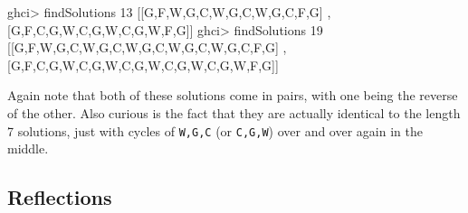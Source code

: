 \documentclass[]{article}
\newenvironment{Shaded}{}{}
\newcommand{\DataTypeTok}[1]{\textcolor[rgb]{0.56,0.13,0.00}{{#1}}}
\newcommand{\DecValTok}[1]{\textcolor[rgb]{0.25,0.63,0.44}{{#1}}}
\newcommand{\FunctionTok}[1]{\textcolor[rgb]{0.02,0.16,0.49}{{#1}}}
\newcommand{\NormalTok}[1]{{#1}}
\begin{document}
\begin{Shaded}
\begin{Highlighting}[]
\NormalTok{ghci}\FunctionTok{>} \NormalTok{findSolutions }\DecValTok{13}
\NormalTok{[[}\DataTypeTok{G}\NormalTok{,}\DataTypeTok{F}\NormalTok{,}\DataTypeTok{W}\NormalTok{,}\DataTypeTok{G}\NormalTok{,}\DataTypeTok{C}\NormalTok{,}\DataTypeTok{W}\NormalTok{,}\DataTypeTok{G}\NormalTok{,}\DataTypeTok{C}\NormalTok{,}\DataTypeTok{W}\NormalTok{,}\DataTypeTok{G}\NormalTok{,}\DataTypeTok{C}\NormalTok{,}\DataTypeTok{F}\NormalTok{,}\DataTypeTok{G}\NormalTok{]}
\NormalTok{,[}\DataTypeTok{G}\NormalTok{,}\DataTypeTok{F}\NormalTok{,}\DataTypeTok{C}\NormalTok{,}\DataTypeTok{G}\NormalTok{,}\DataTypeTok{W}\NormalTok{,}\DataTypeTok{C}\NormalTok{,}\DataTypeTok{G}\NormalTok{,}\DataTypeTok{W}\NormalTok{,}\DataTypeTok{C}\NormalTok{,}\DataTypeTok{G}\NormalTok{,}\DataTypeTok{W}\NormalTok{,}\DataTypeTok{F}\NormalTok{,}\DataTypeTok{G}\NormalTok{]]}
\NormalTok{ghci}\FunctionTok{>} \NormalTok{findSolutions }\DecValTok{19}
\NormalTok{[[}\DataTypeTok{G}\NormalTok{,}\DataTypeTok{F}\NormalTok{,}\DataTypeTok{W}\NormalTok{,}\DataTypeTok{G}\NormalTok{,}\DataTypeTok{C}\NormalTok{,}\DataTypeTok{W}\NormalTok{,}\DataTypeTok{G}\NormalTok{,}\DataTypeTok{C}\NormalTok{,}\DataTypeTok{W}\NormalTok{,}\DataTypeTok{G}\NormalTok{,}\DataTypeTok{C}\NormalTok{,}\DataTypeTok{W}\NormalTok{,}\DataTypeTok{G}\NormalTok{,}\DataTypeTok{C}\NormalTok{,}\DataTypeTok{W}\NormalTok{,}\DataTypeTok{G}\NormalTok{,}\DataTypeTok{C}\NormalTok{,}\DataTypeTok{F}\NormalTok{,}\DataTypeTok{G}\NormalTok{]}
\NormalTok{,[}\DataTypeTok{G}\NormalTok{,}\DataTypeTok{F}\NormalTok{,}\DataTypeTok{C}\NormalTok{,}\DataTypeTok{G}\NormalTok{,}\DataTypeTok{W}\NormalTok{,}\DataTypeTok{C}\NormalTok{,}\DataTypeTok{G}\NormalTok{,}\DataTypeTok{W}\NormalTok{,}\DataTypeTok{C}\NormalTok{,}\DataTypeTok{G}\NormalTok{,}\DataTypeTok{W}\NormalTok{,}\DataTypeTok{C}\NormalTok{,}\DataTypeTok{G}\NormalTok{,}\DataTypeTok{W}\NormalTok{,}\DataTypeTok{C}\NormalTok{,}\DataTypeTok{G}\NormalTok{,}\DataTypeTok{W}\NormalTok{,}\DataTypeTok{F}\NormalTok{,}\DataTypeTok{G}\NormalTok{]]}
\end{Highlighting}
\end{Shaded}

Again note that both of these solutions come in pairs, with one being
the reverse of the other. Also curious is the fact that they are
actually identical to the length 7 solutions, just with cycles of
\texttt{W,G,C} (or \texttt{C,G,W}) over and over again in the middle.

\subsection{Reflections}\label{reflections}
\end{document}
